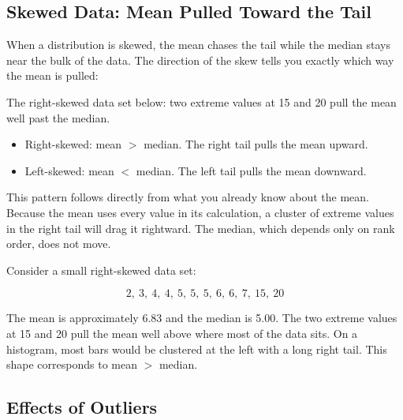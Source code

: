 \subsection{Skewed Data: Mean Pulled Toward the Tail}

When a distribution is skewed, the mean chases the tail while the
median stays near the bulk of the data. The direction of the skew
tells you exactly which way the mean is pulled:

\begin{center}

The right-skewed data set below: two extreme values at 15 and 20
pull the mean well past the median.
\end{center}

\begin{itemize}
    \item Right-skewed: mean $>$ median. The right tail pulls the
    mean upward.
    \item Left-skewed: mean $<$ median. The left tail pulls the mean
    downward.
\end{itemize}

This pattern follows directly from what you already know about the
mean. Because the mean uses every value in its calculation, a cluster
of extreme values in the right tail will drag it rightward. The median, which depends only on rank order, does not
move.

Consider a small right-skewed data set:

\[ 2,\ 3,\ 4,\ 4,\ 5,\ 5,\ 5,\ 6,\ 6,\ 7,\ 15,\ 20 \]

The mean is approximately 6.83 and the median is 5.00. The two extreme
values at 15 and 20 pull the mean well above where most of the data
sits. On a histogram, most bars would be clustered at the left with a
long right tail. This shape corresponds to mean $>$
median.

\subsection{Effects of Outliers}

